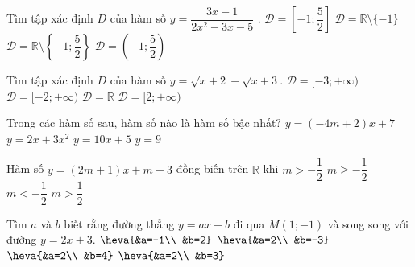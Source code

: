 \begin{ex}%
	Tìm tập xác định $D$ của hàm số $y=\dfrac{3x-1}{2x^2-3x-5}$ .
	\choice
	{$\mathscr{D}=\left[-1;\dfrac{5}{2}\right]$}
	{$\mathscr{D}=\mathbb{R} \setminus \{-1\}$}
	{\True $\mathscr{D}=\mathbb{R} \setminus \left\{-1;\dfrac{5}{2}\right\}$}
	{$\mathscr{D}=\left(-1;\dfrac{5}{2}\right)$}
\end{ex}

\begin{ex}%
	Tìm tập xác định $D$ của hàm số $y=\sqrt{x+2}-\sqrt{x+3}$.
	\choice
	{$\mathscr{D}=[-3;+\infty)$}
	{\True $\mathscr{D}=[-2;+\infty)$}
	{$\mathscr{D}=\mathbb{R}$}
	{$\mathscr{D}=[2;+\infty)$}
	\loigiai{
		Hàm số xác định khi và chỉ khi $\heva{&x+2\ge 0\\ &	x+3\ge 0} \Leftrightarrow x\ge-2.$\\
		Vậy $\mathscr{D}=[-2;+\infty)$.}
\end{ex}

\begin{ex}%
	Trong các hàm số sau, hàm số nào là hàm số bậc nhất?
	\choice
	{$y=(-4m+2)x+7$}
	{$y=2x+3x^2$}
	{\True $y=10x+5$}
	{$y=9$}
\end{ex}

\begin{ex}%
	Hàm số $y=(2m+1)x+m-3$ đồng biến trên $\mathbb{R}$ khi
	\choice
	{\True $m >-\dfrac{1}{2}$}
	{$m\ge-\dfrac{1}{2}$}
	{$m <-\dfrac{1}{2}$}
	{$m >\dfrac{1}{2}$}
\end{ex}

\begin{ex}%
	Tìm $a$ và $b$ biết rằng đường thẳng $y=ax+b$ đi qua $M(1;-1)$ và song song với đường $y=2x+3$.
	\choice
	{$\heva{&a=-1\\ &b=2}$}
	{\True $\heva{&a=2\\ &b=-3}$}
	{$\heva{&a=2\\ &b=4}$}
	{$\heva{&a=2\\ &b=3}$}
\end{ex}

